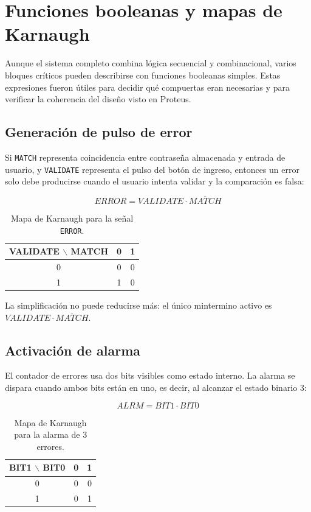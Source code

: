 \documentclass[12pt,a4paper]{article}
\begin{document}
\section{Funciones booleanas y mapas de Karnaugh}
Aunque el sistema completo combina lógica secuencial y combinacional, varios bloques críticos pueden describirse con funciones booleanas simples. Estas expresiones fueron útiles para decidir qué compuertas eran necesarias y para verificar la coherencia del diseño visto en Proteus.

\subsection{Generación de pulso de error}
Si \texttt{MATCH} representa coincidencia entre contraseña almacenada y entrada de usuario, y \texttt{VALIDATE} representa el pulso del botón de ingreso, entonces un error solo debe producirse cuando el usuario intenta validar y la comparación es falsa:

\[
ERROR = VALIDATE \cdot \overline{MATCH}
\]

\begin{table}[H]
    \centering
    \caption{Mapa de Karnaugh para la señal \texttt{ERROR}.}
    \begin{tabular}{c|cc}
        \toprule
        \textbf{VALIDATE $\backslash$ MATCH} & 0 & 1 \\
        \midrule
        0 & 0 & 0 \\
        1 & 1 & 0 \\
        \bottomrule
    \end{tabular}
\end{table}

La simplificación no puede reducirse más: el único mintermino activo es $VALIDATE \cdot \overline{MATCH}$.

\subsection{Activación de alarma}
El contador de errores usa dos bits visibles como estado interno. La alarma se dispara cuando ambos bits están en uno, es decir, al alcanzar el estado binario 3:

\[
ALRM = BIT1 \cdot BIT0
\]

\begin{table}[H]
    \centering
    \caption{Mapa de Karnaugh para la alarma de 3 errores.}
    \begin{tabular}{c|cc}
        \toprule
        \textbf{BIT1 $\backslash$ BIT0} & 0 & 1 \\
        \midrule
        0 & 0 & 0 \\
        1 & 0 & 1 \\
        \bottomrule
    \end{tabular}
\end{table}
\end{document}
